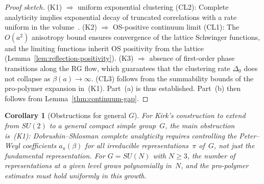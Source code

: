 \documentclass[12pt,a4paper]{article}
\theoremstyle{definition}
\theoremstyle{plain}
\newtheorem{corollary}[definition]{Corollary}
\theoremstyle{remark}
\begin{document}
\begin{proof}[Proof sketch]
(K1) $\Rightarrow$ uniform exponential clustering (CL2): Complete analyticity
implies exponential decay of truncated correlations with a rate uniform
in the volume~\cite{DobrushinShlosman1985}. (K2) $\Rightarrow$ OS-positive continuum limit (CL1):
The $O(a^2)$ anisotropy bound ensures convergence of the lattice Schwinger functions,
and the limiting functions inherit OS positivity from the lattice
(Lemma~\ref{lem:reflection-positivity}). (K3) $\Rightarrow$ absence of
first-order phase transitions along the RG flow, which guarantees that the
clustering rate $\Delta_0$ does not collapse as $\beta(a) \to \infty$. (CL3) follows
from the summability bounds of the pro-polymer expansion in~(K1). Part~(a) is
thus established. Part~(b) then follows from Lemma~\ref{thm:continuum-gap}.
\end{proof}

\begin{corollary}[Obstructions for general $G$]
For Kirk's construction to extend from $SU(2)$ to a general compact simple
group~$G$, the main obstruction is~\textup{(K1)}: Dobrushin--Shlosman complete
analyticity requires controlling the Peter--Weyl coefficients $a_\pi(\beta)$
for \emph{all} irreducible representations~$\pi$ of~$G$, not just the
fundamental representation. For $G = SU(N)$ with $N \geq 3$, the number of
representations at a given level grows polynomially in~$N$, and the
pro-polymer estimates must hold uniformly in this growth.
\end{corollary}
\end{document}
